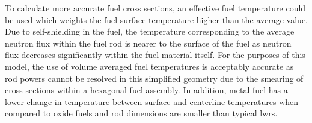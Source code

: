       To calculate more accurate fuel cross sections, an effective fuel 
      temperature could be used which weights the fuel surface temperature 
      higher than the average value. Due to self-shielding in the fuel, the 
      temperature corresponding to the average neutron flux within the fuel rod 
      is nearer to the surface of the fuel as neutron flux decreases
      significantly within the fuel material itself. For the purposes of this
      model, the use of volume averaged fuel temperatures is acceptably accurate
      as rod powers cannot be resolved in this simplified geometry due to the
      smearing of cross sections within a hexagonal fuel assembly. In addition,
      metal fuel has a lower change in temperature between surface and
      centerline temperatures when compared to oxide fuels and rod dimensions
      are smaller than typical \glspl{lwr}.

